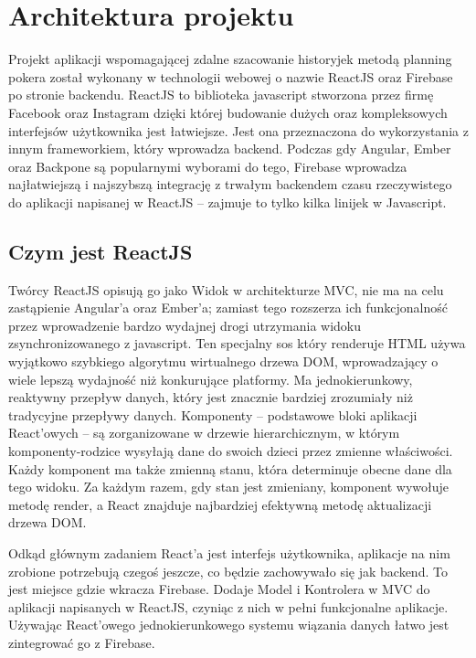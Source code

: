 
\chapter{Architektura projektu}

Projekt aplikacji wspomagającej zdalne szacowanie historyjek metodą planning pokera został wykonany w technologii webowej
o nazwie ReactJS oraz Firebase po stronie backendu.
ReactJS to biblioteka javascript stworzona przez firmę Facebook
oraz Instagram dzięki której budowanie dużych oraz kompleksowych interfejsów użytkownika jest łatwiejsze.
Jest ona przeznaczona do wykorzystania z innym frameworkiem, który wprowadza backend.
Podczas gdy Angular, Ember oraz Backpone są popularnymi wyborami do tego,
Firebase wprowadza najłatwiejszą i najszybszą integrację z trwałym backendem
czasu rzeczywistego do aplikacji napisanej w ReactJS – zajmuje to tylko kilka linijek w Javascript. 

\section{Czym jest ReactJS}

Twórcy ReactJS opisują go jako Widok w architekturze MVC,
nie ma na celu zastąpienie Angular’a oraz Ember’a;
zamiast tego rozszerza ich funkcjonalność przez wprowadzenie bardzo wydajnej drogi utrzymania widoku zsynchronizowanego z javascript.
Ten specjalny sos który renderuje HTML używa wyjątkowo szybkiego algorytmu wirtualnego drzewa DOM,
wprowadzający o wiele lepszą wydajność niż konkurujące platformy. Ma jednokierunkowy, reaktywny przepływ danych,
który jest znacznie bardziej zrozumiały niż tradycyjne przepływy danych.
Komponenty – podstawowe bloki aplikacji React'owych – są zorganizowane w drzewie hierarchicznym,
w którym komponenty-rodzice wysyłają dane do swoich dzieci przez zmienne właściwości.
Każdy komponent ma także zmienną stanu, która determinuje obecne dane dla tego widoku.
Za każdym razem, gdy stan jest zmieniany, komponent wywołuje metodę render, a React znajduje najbardziej efektywną metodę aktualizacji drzewa DOM\@.

Odkąd głównym zadaniem React’a jest interfejs użytkownika,
aplikacje na nim zrobione potrzebują czegoś jeszcze,
co będzie zachowywało się jak backend.
To jest miejsce gdzie wkracza Firebase.
Dodaje Model i Kontrolera w MVC do aplikacji napisanych w ReactJS, czyniąc z nich w pełni funkcjonalne aplikacje.
Używając React’owego jednokierunkowego systemu wiązania danych łatwo jest zintegrować go z Firebase.\cite{www_react}

